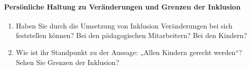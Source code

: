 \paragraph{Persönliche Haltung zu Veränderungen und Grenzen der Inklusion}
\begin{enumerate}
\item Haben Sie durch die Umsetzung von Inklusion Veränderungen bei sich feststellen können? Bei den pädagogischen Mitarbeitern? Bei den Kindern? 
\item Wie ist ihr Standpunkt zu der Aussage: „Allen Kindern gerecht werden“? Sehen Sie Grenzen der Inklusion?
\end{enumerate}